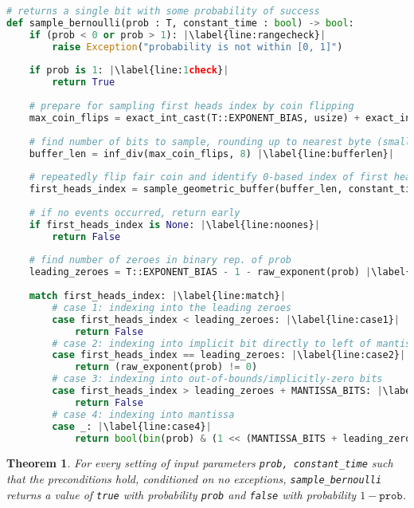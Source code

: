 \documentclass[11pt,a4paper]{article}
\newtheorem{theorem}{Theorem}[section]
\theoremstyle{definition}
\begin{document}
\begin{lstlisting}[language=Python, escapechar=|]
# returns a single bit with some probability of success
def sample_bernoulli(prob : T, constant_time : bool) -> bool:
    if (prob < 0 or prob > 1): |\label{line:rangecheck}|
        raise Exception("probability is not within [0, 1]")
        
    if prob is 1: |\label{line:1check}|
        return True
        
    # prepare for sampling first heads index by coin flipping
    max_coin_flips = exact_int_cast(T::EXPONENT_BIAS, usize) + exact_int_cast(T::MANTISSA_BITS) |\label{line:maxcoinflips}|
    
    # find number of bits to sample, rounding up to nearest byte (smallest sample size)
    buffer_len = inf_div(max_coin_flips, 8) |\label{line:bufferlen}|
    
    # repeatedly flip fair coin and identify 0-based index of first heads
    first_heads_index = sample_geometric_buffer(buffer_len, constant_time) |\label{line:sampling}|
    
    # if no events occurred, return early
    if first_heads_index is None: |\label{line:noones}|
        return False
    
    # find number of zeroes in binary rep. of prob
    leading_zeroes = T::EXPONENT_BIAS - 1 - raw_exponent(prob) |\label{line:leadingzeroes}|
    
    match first_heads_index: |\label{line:match}|
        # case 1: indexing into the leading zeroes
        case first_heads_index < leading_zeroes: |\label{line:case1}|
            return False
        # case 2: indexing into implicit bit directly to left of mantissa
        case first_heads_index == leading_zeroes: |\label{line:case2}|
            return (raw_exponent(prob) != 0)
        # case 3: indexing into out-of-bounds/implicitly-zero bits
        case first_heads_index > leading_zeroes + MANTISSA_BITS: |\label{line:case3}|
            return False
        # case 4: indexing into mantissa
        case _: |\label{line:case4}|
            return bool(bin(prob) & (1 << (MANTISSA_BITS + leading_zeroes - first_heads_index)))

\end{lstlisting}

\begin{tcolorbox}
\begin{theorem} For every setting of input parameters \texttt{prob, constant\_time} such that the preconditions hold, conditioned on no exceptions, \texttt{sample\_bernoulli} returns a value of \texttt{true} with probability \texttt{prob} and \texttt{false} with probability $1 - \texttt{prob}$. 
\end{theorem}
\end{tcolorbox}
\end{document}

